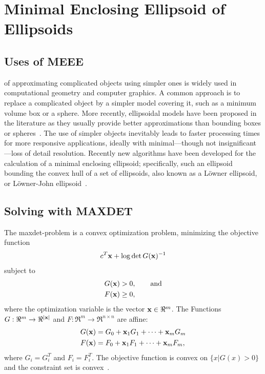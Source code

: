 \chapter{Minimal Enclosing Ellipsoid of Ellipsoids}\label{chapter:meee}

\section{Uses of MEEE}

 of approximating complicated objects using simpler ones is widely used in computational geometry
and computer graphics. A common approach is to replace a complicated object by a simpler model covering it, such as a
minimum volume box or a sphere. More recently, ellipsoidal models have been proposed in the literature as they usually
provide better approximations than bounding boxes or spheres~\cite{yildirim06,sturm03,shiang00,ju01}. The use of simpler
objects inevitably leads to faster processing times for more responsive applications, ideally with minimal---though not
insignificant---loss of detail resolution. Recently new algorithms have been developed for the calculation of a minimal
enclosing ellipsoid; specifically, such an ellipsoid bounding the convex hull of a set of ellipsoids, also known as a
L\"owner ellipsoid, or L\"owner-John ellipsoid~\cite{yildirim06}.


\section{Solving with MAXDET}

The maxdet-problem is a convex optimization problem, minimizing the objective function
\begin{equation}\label{eqn:maxdetobj}
    c^T\mathbf{x} + \log \det G(\mathbf{x})^{-1}
\end{equation}
subject to
\begin{align}
     G(\mathbf{x}) &>     0,\qquad\text{and}\nonumber\\
     F(\mathbf{x}) &\geq  0,\label{eqn:maxdetcons}
\end{align}
where the optimization variable is the vector $\mathbf{x}\in\Re^m$. The Functions 
$G:\Re^m\rightarrow\Re^{\left|\mathbf{x}\right|}$ and $F:\Re^m\rightarrow\Re^{n\times n}$ are affine:
\begin{align}
    G(\mathbf{x}) &= G_0 + \mathbf{x}_1G_1 + \dots + \mathbf{x}_mG_m\nonumber\\
    F(\mathbf{x}) &= F_0 + \mathbf{x}_1F_1 + \dots + \mathbf{x}_mF_m\label{eqn:maxdet},
\end{align} 
where $G_i=G_i^T$ and $F_i=F_i^T$. The objective function is convex on $\{x|G(x)>0\}$ and the constraint set is
convex~\cite{vandenberghe96}.

